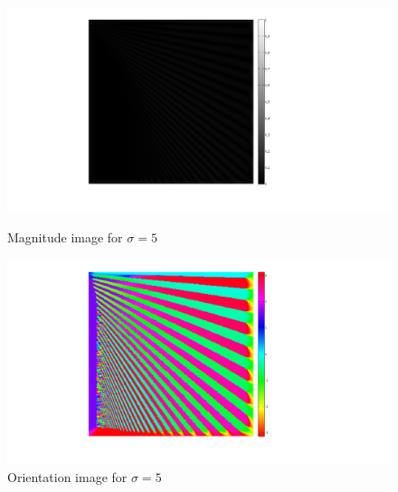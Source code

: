 \documentclass[a4paper,10pt]{article}
\begin{document}
\begin{figure}[ht]
\begin{minipage}[b]{0.45\linewidth}
\centering
\includegraphics[width=\textwidth]{pn1_img/magnitude_sigma5}
\caption{Magnitude image for $\sigma=5$}
\end{minipage}
\hspace{0.1cm}
\begin{minipage}[b]{0.45\linewidth}
\centering
\includegraphics[width=\textwidth]{pn1_img/orientation_sigma5}
\caption{Orientation image for $\sigma=5$}
\end{minipage}
\end{figure}
\end{document}
